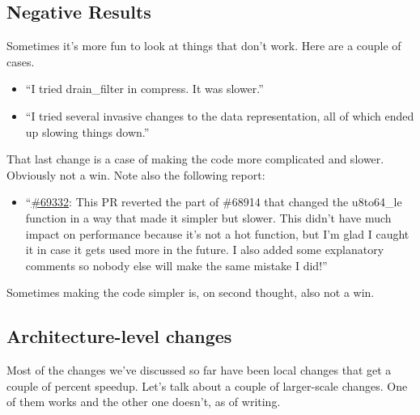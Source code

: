 \documentclass[a4paper]{report}
\begin{document}
\subsection*{Negative Results}
Sometimes it's more fun to look at things that don't work. Here are a couple of cases.
\begin{itemize}[noitemsep]
\item ``I tried drain\_filter in compress. It was slower.''
\item ``I tried several invasive changes to the data representation, all of which ended up slowing things down.''
\end{itemize}
That last change is a case of making the code more complicated and slower. Obviously not a win. Note also the following report:
\begin{itemize}[noitemsep]
\item ``\href{https://github.com/rust-lang/rust/pull/69332}{\#69332}: This PR reverted the part of \#68914 that changed the u8to64\_le function in a way that made it simpler but slower. This didn't have much impact on performance because it's not a hot function, but I'm glad I caught it in case it gets used more in the future. I also added some explanatory comments so nobody else will make the same mistake I did!''
\end{itemize}
Sometimes making the code simpler is, on second thought, also not a win.

\subsection*{Architecture-level changes}
Most of the changes we've discussed so far have been local changes that get a couple of
percent speedup. Let's talk about a couple of larger-scale changes. One of them works
and the other one doesn't, as of writing.
\end{document}
